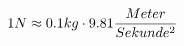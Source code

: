 \documentclass[preview]{standalone}
\begin{document}
\begin{align*}
\special{dvisvgm:raw <g id='unique000'>}1N \approx 0.1 kg \cdot 9.81 \frac{Meter}{Sekunde^{2}}\special{dvisvgm:raw </g>}
\end{align*}
\end{document}
